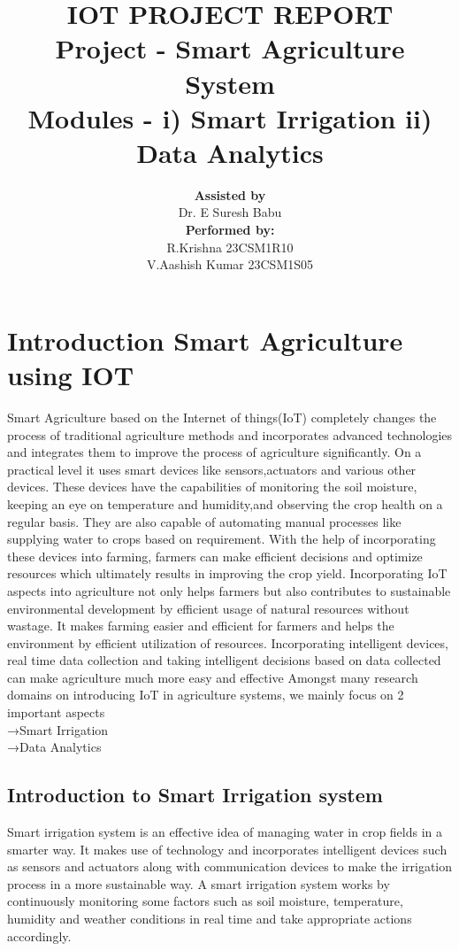 \documentclass{article}
\title{\fontsize{16}{18}\selectfont\textbf{IOT PROJECT REPORT}\\[1em] \fontsize{14}{16}\selectfont\textbf{Project - Smart Agriculture System}\\[1em] \fontsize{12}{14}\selectfont\textbf{Modules - i) Smart Irrigation ii) Data Analytics}}
\author{\textbf{Assisted by}\\ Dr. E Suresh Babu \\[1em] \textbf{Performed by:}\\ R.Krishna 23CSM1R10 \\ V.Aashish Kumar 23CSM1S05}
\date{}
\begin{document}
\maketitle
\thispagestyle{empty} %

\newpage





\tableofcontents %

\newpage
\section{Introduction Smart Agriculture using IOT}
Smart Agriculture based on the Internet of things(IoT) completely changes the process of traditional agriculture methods and incorporates advanced technologies and integrates them to improve the process of agriculture significantly. On a practical level it uses smart devices like sensors,actuators and various other devices. These devices have the capabilities of monitoring the soil moisture, keeping an eye on temperature and humidity,and observing the crop health on a regular basis. They are also capable of automating manual processes like supplying water to crops based on requirement. With the help of incorporating these devices into farming, farmers can make efficient decisions and optimize resources which ultimately results in improving the crop yield. Incorporating IoT aspects into agriculture not only helps farmers but also contributes to sustainable environmental development by efficient usage of natural resources without wastage. It makes farming easier and efficient for farmers and helps the environment by efficient utilization of resources. Incorporating intelligent devices, real time data collection and taking intelligent decisions based on data collected can make agriculture much more easy and effective
		Amongst many research domains on introducing IoT in agriculture systems, we mainly focus on 2 important aspects\\
	→Smart Irrigation\\
	→Data Analytics



\subsection{Introduction to Smart Irrigation system }
Smart irrigation system is an effective idea of managing water in crop fields in a smarter way. It makes use of technology and incorporates intelligent devices such as sensors and actuators along with communication devices to make the irrigation process in a more sustainable way. A smart irrigation system works by continuously monitoring some factors such as soil moisture, temperature, humidity and weather conditions in real time and take appropriate actions accordingly.
\end{document}
